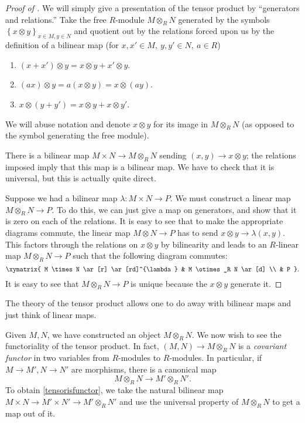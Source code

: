 \begin{proof}[Proof of ] We will simply give
a presentation of the tensor product by
``generators and relations.''
Take the free $R$-module $M \otimes_R N$ generated by the symbols $\left\{x
\otimes
y\right\}_{x \in M, y \in N}$ and quotient out by the relations forced upon us
by the definition of a bilinear map (for $x, x' \in M, \  y, y' \in N, \   a
\in R$)
\begin{enumerate}
\item  $(x+x') \otimes y = x \otimes y + x' \otimes y$.
\item $(ax) \otimes y = a(x \otimes y) = x \otimes (ay)$.
\item  $x \otimes (y+y') = x \otimes y + x \otimes y'$.
\end{enumerate}

We will abuse notation and denote $x \otimes y$ for its image in $M \otimes_R
N$ (as opposed to the symbol generating the free module).

There is a bilinear map $M \times N \to M \otimes_R N$ sending $(x,y) \to x
\otimes y$; the relations imposed imply  that this map is a bilinear map. We
have to check
that it is universal, but this is actually quite direct.

Suppose we had a bilinear map $\lambda: M \times N \to P$.  We must construct
a linear map $M
\otimes_R N \to P$.
To do this, we can just give a map on generators, and show that it is zero on
each of the relations.
It is easy to see that to make the appropriate diagrams commute, the linear
map $M \otimes N \to P$ has to send $x \otimes y \to \lambda(x,y)$.
This factors
through the relations on $x \otimes y$ by bilinearity and leads to an
$R$-linear map $M \otimes_{R} N \to P$ such that the following diagram
commutes:
\[
\xymatrix{
M \times N \ar[r] \ar[rd]^{\lambda} &  M \otimes_R N \ar[d] \\
& P
}.\]
It is easy to see that $M \otimes_R N \to P$ is unique because the $x \otimes
y$ generate it.
\end{proof}


The theory of the tensor product allows one to do away with bilinear maps and
just think of linear maps.

Given $M, N$, we have constructed an object $M \otimes_R N$. We now wish to  see
the functoriality of the tensor product. In fact, $(M,N) \to M \otimes_R N$ is a \emph{covariant
functor} in two variables from $R$-modules to $R$-modules.
In particular, if $M \to M', N \to N'$ are morphisms, there is a canonical map
\begin{equation} \label{tensorisfunctor} M \otimes_R N \to M' \otimes_R N'.
\end{equation}
To obtain \cref{tensorisfunctor}, we take the natural bilinear map $M \times N \to M' \times N'
\to M' \otimes_R N'$ and use the universal property of $M \otimes_R N$ to get
a map out of it.

